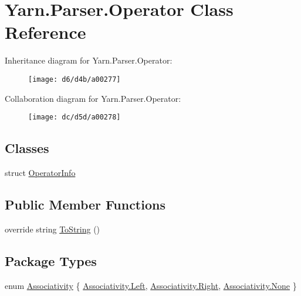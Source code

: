 \hypertarget{a00058}{\section{Yarn.\-Parser.\-Operator Class Reference}
\label{a00058}
}


Inheritance diagram for Yarn.\-Parser.\-Operator\-:
\nopagebreak
\begin{figure}[H]
\begin{center}
\leavevmode
\texttt{[image: d6/d4b/a00277]}
\end{center}
\end{figure}


Collaboration diagram for Yarn.\-Parser.\-Operator\-:
\nopagebreak
\begin{figure}[H]
\begin{center}
\leavevmode
\texttt{[image: dc/d5d/a00278]}
\end{center}
\end{figure}
\subsection*{Classes}
\begin{DoxyCompactItemize}
\item 
struct \hyperlink{a00059}{Operator\-Info}
\end{DoxyCompactItemize}
\subsection*{Public Member Functions}
\begin{DoxyCompactItemize}
\item 
override string \hyperlink{a00063_a18c67cb16090d0889bb9d6c8c6c565f8}{To\-String} ()
\end{DoxyCompactItemize}
\subsection*{Package Types}
\begin{DoxyCompactItemize}
\item 
enum \hyperlink{a00058_a83fa1b8db0e6678006920812b6f33f62}{Associativity} \{ \hyperlink{a00058_a83fa1b8db0e6678006920812b6f33f62a945d5e233cf7d6240f6b783b36a374ff}{Associativity.\-Left}, 
\hyperlink{a00058_a83fa1b8db0e6678006920812b6f33f62a92b09c7c48c520c3c55e497875da437c}{Associativity.\-Right}, 
\hyperlink{a00058_a83fa1b8db0e6678006920812b6f33f62a6adf97f83acf6453d4a6a4b1070f3754}{Associativity.\-None}
 \}
\end{DoxyCompactItemize}
